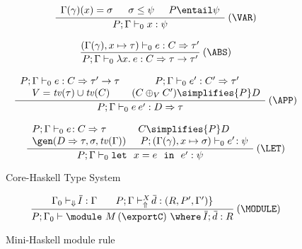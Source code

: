 \begin{figure}
\[ \begin{array}{cc}
      \displaystyle\frac
        {\begin{array}[t]{lll}
           \Gamma(\gamma)(x) = \sigma\ & \:\sigma \leq \psi\: & \:P \entail \psi
         \end{array}}
        {P;\Gamma \vdash_0 x: \psi} \:(\VAR) \\ \\

	\displaystyle\frac
          {(\Gamma(\gamma),x \mapsto \tau) \vdash_0 e: C \Rightarrow \tau'}
	  {P;\Gamma \vdash_0 \lambda x.\:e: C\Rightarrow \tau \rightarrow \tau'} \:(\ABS)  \\ \\

	\displaystyle\frac
	  {\begin{array}[t]{cc}
             P;\Gamma \vdash_0 e: C \Rightarrow \tau' \rightarrow \tau\: &\:
             P;\Gamma \vdash_0 e': C' \Rightarrow \tau' \\
             V = \tv(\tau) \cup \tv(C) & (C \oplus_V C') \simplifies{P} D
           \end{array}}
	{P;\Gamma \vdash_0 e\:e': D\Rightarrow \tau} \:(\APP) \\ \\

	\displaystyle\frac
	 {\begin{array}{ll}
            P;\Gamma \vdash_0 e\!:C \Rightarrow \tau & C \simplifies{P} D\\
             \gen(D\Rightarrow \tau,\sigma,\tv(\Gamma))\: & \:P;(\Gamma(\gamma),x \mapsto\sigma) \vdash_0 e'\!:\psi
          \end{array}}
	 {P;\Gamma \vdash_0 \mlet\ x=e\ \iin\ e':\psi} \:(\LET)
\end{array} \]
\caption{Core-Haskell Type System}
\label{fig:core-haskell-type-system}
\end{figure}

\begin{figure}
\[ \begin{array}{cc}
	\displaystyle\frac
	 {\begin{array}{ll}
           \Gamma_0 \vdash_{\Downarrow} \overline{\!I} : \Gamma\:\: & \:\:P;\Gamma \vdash_{\Uparrow}^X \overline{\!d} : (R,P',\Gamma') \}
          \end{array}}
	 {P;\Gamma_0 \vdash \module\ M\, (\exportC)\ \where\ \overline{\!I};\, \overline{\!d} : R} \:(\MODULE)
\end{array} \]
\caption{Mini-Haskell module rule} 
\label{fig:mini-haskell-module-rule}
\end{figure}

